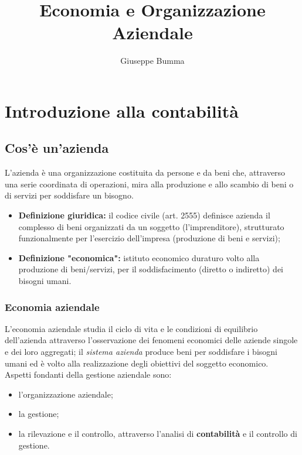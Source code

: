 \documentclass{article}
\title{Economia e Organizzazione Aziendale}
\author{Giuseppe Bumma}
\begin{document}
\newcommand{\R}{\mathbb{R}}
\newcommand{\bb}[1]{\mathbb{#1}}
\newcommand{\cc}[1]{\mathcal{#1}}
\newcommand{ \lognormal }{\text{Lognormal} }
\newcommand{\T}[1]{\text{#1}}
\newcommand{\tb}[1]{\textbf{#1}}
\newcommand*\circled[1]{\tikz[baseline=(char.base)]{%
            \node[shape=circle,draw,inner sep=2pt] (char) {#1};}}


\tableofcontents

\maketitle

\section{Introduzione alla contabilità}
\subsection{Cos'è un'azienda}
L'azienda è una organizzazione costituita da persone e da beni che, attraverso
una serie coordinata di operazioni, mira alla produzione e allo scambio di beni o
di servizi per soddisfare un bisogno.
\begin{itemize}
    \item \textbf{Definizione giuridica:} il codice civile (art. 2555) definisce azienda il complesso di beni
    organizzati da un soggetto (l'imprenditore), strutturato funzionalmente per
    l'esercizio dell'impresa (produzione di beni e servizi);
    \item \textbf{Definizione "economica":} istituto economico duraturo volto alla produzione di
    beni/servizi, per il soddisfacimento (diretto o indiretto) dei bisogni umani.
\end{itemize}


\subsubsection{Economia aziendale}
L'economia aziendale studia il ciclo
di vita e le condizioni di equilibrio
dell'azienda attraverso l'osservazione
dei fenomeni economici delle
aziende singole e dei loro aggregati; il \textit{sistema azienda} produce beni
per soddisfare i bisogni umani ed è
volto alla realizzazione degli obiettivi
del soggetto economico.
\vspace*{0.2cm}\\
Aspetti fondanti della gestione aziendale sono:
\begin{itemize}
    \item l'organizzazione aziendale;
    \item la gestione;
    \item la rilevazione e il controllo, attraverso l'analisi di \textbf{contabilità} e il controllo di gestione.
\end{itemize}
\end{document}
